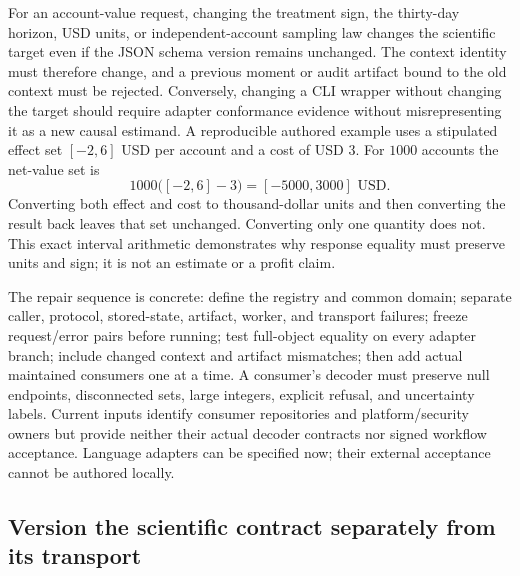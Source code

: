 For an account-value request, changing the treatment sign, the thirty-day
horizon, USD units, or independent-account sampling law changes the scientific
target even if the JSON schema version remains unchanged. The context identity
must therefore change, and a previous moment or audit artifact bound to the
old context must be rejected. Conversely, changing a CLI wrapper without
changing the target should require adapter conformance evidence without
misrepresenting it as a new causal estimand. A reproducible authored example
uses a stipulated effect set $[-2,6]$ USD per account and a cost of USD $3$.
For $1000$ accounts the net-value set is
\[
 1000\bigl([-2,6]-3\bigr)=[-5000,3000]\text{ USD}.
\]
Converting both effect and cost to thousand-dollar units and then converting
the result back leaves that set unchanged. Converting only one quantity does
not. This exact interval arithmetic demonstrates why response equality must
preserve units and sign; it is not an estimate or a profit claim.
\citep{exec17_continuity_reference}

The repair sequence is concrete: define the registry and common domain;
separate caller, protocol, stored-state, artifact, worker, and transport
failures; freeze request/error pairs before running; test full-object equality
on every adapter branch; include changed context and artifact mismatches;
then add actual maintained consumers one at a time. A consumer's decoder must
preserve null endpoints, disconnected sets, large integers, explicit refusal,
and uncertainty labels. Current inputs identify consumer repositories and
platform/security owners but provide neither their actual decoder contracts
nor signed workflow acceptance. Language adapters can be specified now;
their external acceptance cannot be authored locally.
\citep{exec16_parity_design,exec17_continuity_contract}

\subsection{Version the scientific contract separately from its transport}
\label{exec17:versions}

